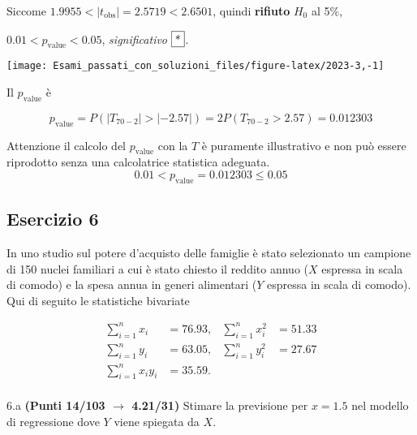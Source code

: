 \documentclass[
  11pt,
]{book}
\theoremstyle{mytheoremstyle}
\theoremstyle{mydefstyle}
\newenvironment{sol}
  {
  \begin{tcolorbox}[enhanced,breakable,arc=0.1mm,boxrule=1pt,colback=white,colframe=iblue,
  title=\bf \fontfamily{lmss}\selectfont \hspace{.5 cm} Soluzione,drop fuzzy shadow]

}{
\end{tcolorbox}
  }
\begin{document}
\begin{sol}
Siccome \(1.9955<|t_\text{obs}|=2.5719<2.6501\), quindi \textbf{rifiuto} \(H_0\) al 5\%,

\(0.01<p_\text{value}<0.05\), \emph{significativo} \(\fbox{*}\).

\begin{center}\texttt{[image: Esami\_passati\_con\_soluzioni\_files/figure-latex/2023-3,-1]} \end{center}

Il \(p_{\text{value}}\) è

\[ p_{\text{value}} = P(|T_{70-2}|>|-2.57|)=2P(T_{70-2}>2.57)=0.012303 \]

Attenzione il calcolo del \(p_\text{value}\) con la \(T\) è puramente illustrativo e non può essere riprodotto senza una calcolatrice statistica adeguata.\[
 0.01 < p_\text{value}= 0.012303 \leq 0.05 
\]

\end{sol}

\subsection{Esercizio 6}\label{esercizio-6-17}

In uno studio sul potere d'acquisto delle famiglie è stato selezionato un campione di 150 nuclei familiari
a cui è stato chiesto il reddito annuo (\(X\) espressa in scala di comodo) e la spesa annua in generi alimentari (\(Y\) espressa in scala di comodo). Qui di seguito le statistiche bivariate

\begin{align*}
\sum_{i=1}^n x_i &= 76.93,   &\sum_{i=1}^n x_i^2 &= 51.33 \\
\sum_{i=1}^n y_i &= 63.05,   &\sum_{i=1}^n y_i^2 &= 27.67 \\
\sum_{i=1}^n x_iy_i &= 35.59.    \\
\end{align*}

6.a \textbf{(Punti 14/103 \(\rightarrow\) 4.21/31)} Stimare la previsione per \(x=1.5\) nel modello di regressione dove \(Y\) viene spiegata da \(X\).
\end{document}
